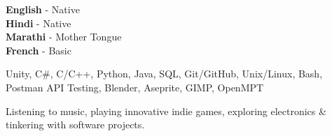 \documentclass[9pt]{developercv}
\begin{document}
	\begin{minipage}[t]{0.3\textwidth}
		\vspace{-\baselineskip}
		
		
		\textbf{English} - Native\\
		\textbf{Hindi} - Native\\
		\textbf{Marathi} - Mother Tongue\\
		\textbf{French} - Basic
	\end{minipage}
	\hfill
	\begin{minipage}[t]{0.3\textwidth}
		\vspace{-\baselineskip}
		
		
		Unity, C\#, C/C++, Python, Java, SQL, Git/GitHub, Unix/Linux, Bash, Postman API Testing, Blender, Aseprite, GIMP, OpenMPT
	\end{minipage}
	\hfill
	\begin{minipage}[t]{0.3\textwidth}
		\vspace{-\baselineskip}
		
		
		Listening to music, playing innovative indie games, exploring electronics \& tinkering with software projects.
	\end{minipage}
	
	
\end{document}
